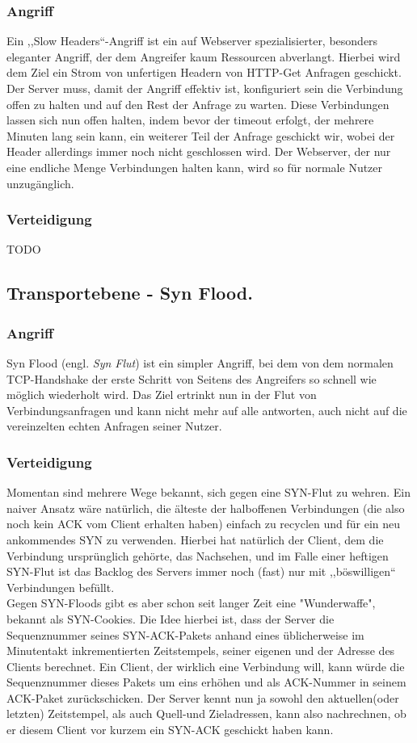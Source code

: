 \documentclass[12pt,a4paper]{article}
\begin{document}
\subsubsection*{Angriff}
Ein ,,Slow Headers``-Angriff ist ein auf Webserver spezialisierter, besonders eleganter Angriff, der dem Angreifer kaum Ressourcen abverlangt. Hierbei wird dem Ziel ein Strom von unfertigen Headern von HTTP-Get Anfragen geschickt. Der Server muss, damit der Angriff effektiv ist, konfiguriert sein die Verbindung offen zu halten und auf den Rest der Anfrage zu warten. Diese Verbindungen lassen sich nun offen halten, indem bevor der timeout erfolgt, der mehrere Minuten lang sein kann, ein weiterer Teil der Anfrage geschickt wir, wobei der Header allerdings immer noch nicht geschlossen wird. Der Webserver, der nur eine endliche Menge Verbindungen halten kann, wird so für normale Nutzer unzugänglich.
\subsubsection*{Verteidigung}
TODO
\subsection{Transportebene - Syn Flood.}
\subsubsection*{Angriff}
Syn Flood (engl. \textit{Syn Flut}) ist ein simpler Angriff, bei dem von dem normalen TCP-Handshake der erste Schritt von Seitens des Angreifers so schnell wie möglich wiederholt wird. Das Ziel ertrinkt nun in der Flut von Verbindungsanfragen und kann nicht mehr auf alle antworten, auch nicht auf die vereinzelten echten Anfragen seiner Nutzer.
\subsubsection*{Verteidigung}
Momentan sind mehrere Wege bekannt, sich gegen eine SYN-Flut zu wehren. Ein naiver Ansatz wäre natürlich, die älteste der halboffenen Verbindungen (die also noch kein ACK vom Client erhalten haben) einfach zu recyclen und für ein neu ankommendes SYN zu verwenden. Hierbei hat natürlich der Client, dem die Verbindung ursprünglich gehörte, das Nachsehen, und im Falle einer heftigen SYN-Flut ist das Backlog des Servers immer noch (fast) nur mit ,,böswilligen`` Verbindungen befüllt.\\
Gegen SYN-Floods gibt es aber schon seit langer Zeit eine "Wunderwaffe", bekannt als SYN-Cookies. Die Idee hierbei ist, dass der Server die Sequenznummer seines SYN-ACK-Pakets anhand eines üblicherweise im Minutentakt inkrementierten Zeitstempels, seiner eigenen und der Adresse des Clients berechnet. Ein Client, der wirklich eine Verbindung will, kann würde die Sequenznummer dieses Pakets um eins erhöhen und als ACK-Nummer in seinem ACK-Paket zurückschicken. Der Server kennt nun ja sowohl den aktuellen(oder letzten) Zeitstempel, als auch Quell-und Zieladressen, kann also nachrechnen, ob er diesem Client vor kurzem ein SYN-ACK geschickt haben kann.
\end{document}
